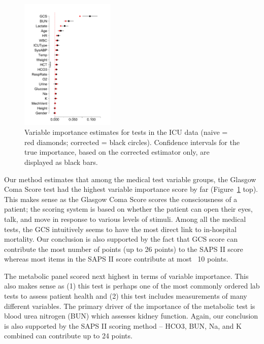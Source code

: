 \documentclass{article}
\begin{document}
\begin{figure}
 \includegraphics[width=0.4\textwidth]{images/icu_individual}
\caption{
	Variable importance estimates for tests in the ICU data (naive = red diamonds; corrected = black circles). Confidence intervals for the true importance, based on the corrected estimator only, are displayed as black bars.
}
\label{fig:icu_dat}
\end{figure}

Our method estimates that among the medical test variable groups, the Glasgow Coma Score test had the highest variable importance score by far (Figure~\ref{fig:icu_dat} top).
This makes sense as the Glasgow Coma Score scores the consciousness of a patient; the scoring system is based on whether the patient can open their eyes, talk, and move in response to various levels of stimuli.
Among all the medical tests, the GCS intuitively seems to have the most direct link to in-hospital mortality.
Our conclusion is also supported by the fact that GCS score can contribute the most number of points (up to 26 points) to the SAPS II score whereas most items in the SAPS II score contribute at most ~10 points.

The metabolic panel scored next highest in terms of variable importance.
This also makes sense as (1) this test is perhaps one of the most commonly ordered lab tests to assess patient health and (2) this test includes measurements of many different variables.
The primary driver of the importance of the metabolic test is blood urea nitrogen (BUN) which assesses kidney function.
Again, our conclusion is also supported by the SAPS II scoring method -- HCO3, BUN, Na, and K combined can contribute up to 24 points.
\end{document}
